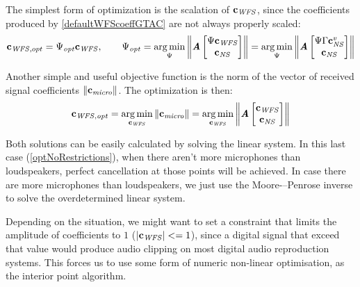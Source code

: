 The simplest form of optimization is the scalation of $\mathbf{c}_{\mathit{WFS}}$, since the coefficients produced by \autoref{defaultWFScoeffGTAC} are not always properly scaled:
\begin{equation}
\coef[vec][WFS][,opt] = \correctionFactor_{\mathit{opt}} \coef[vec][WFS] , \qquad  \correctionFactor_{\mathit{opt}} =
	\argmin_{\correctionFactor}
	\norm{\AcPath[mat]
		\begin{bmatrix}
			\correctionFactor \coef[vec][WFS]\\
				\coef[vec][NS]\\
		\end{bmatrix}
	} = \argmin_{\correctionFactor}
\norm{\AcPath[mat]
\begin{bmatrix}
	\correctionFactor \wfsNormCoef[mat] \coef[vec][NS]<virtual>\\
	\coef[vec][NS]\\
\end{bmatrix}
}\label{OptScalation}
\end{equation}

Another simple and useful objective function is the norm of the vector of received signal coefficients $\left\| \mathbf{c_\mathit{micro}} \right\|$. The optimization is then:
\begin{equation}
\mathbf{c_{\mathit{WFS}, \mathit{opt}}} =
\operatorname*{arg\,min}_{\mathbf{c_\mathit{WFS}}}
\left\| \mathbf{c_\mathit{micro}} \right\| =
\operatorname*{arg\,min}_{\mathbf{c_\mathit{WFS}}}
\left\| \bm{\mathit{A}}
\begin{bmatrix}
\mathbf{c_\mathit{WFS}}\\
\mathbf{c_\mathit{NS}}\\
\end{bmatrix}
 \right\|
\label{optNoRestrictions}
\end{equation}

Both solutions can be easily calculated by solving the linear system. In this last case (\autoref{optNoRestrictions}), when there aren't more microphones than loudspeakers, perfect cancellation at those points will be achieved. In case there are more microphones than loudspeakers, we just use the Moore-–Penrose inverse to solve the overdetermined linear system.

Depending on the situation, we might want to set a constraint that limits the amplitude of coefficients to $1$ ($\left | \mathbf{c}_{\mathit{WFS}} \right | <= 1$), since a digital signal that exceed that value would produce audio clipping on most digital audio reproduction systems. This forces us to use some form of numeric non-linear optimisation, as the interior point algorithm.

